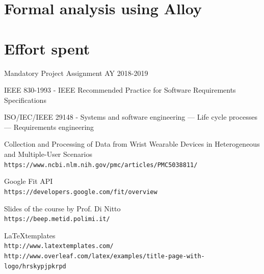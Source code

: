 \documentclass[12pt]{article}
\begin{document}
\clearpage
\section{Formal analysis using Alloy}
\label{sec:alloy}

\clearpage
\section{Effort spent}
\label{sec:effort}

\clearpage
\begin{thebibliography}{9}
   Mandatory Project Assignment AY 2018-2019

   IEEE 830-1993 - IEEE Recommended Practice for Software Requirements Specifications

   ISO/IEC/IEEE 29148 - Systems and software engineering — Life cycle processes — Requirements engineering

   Collection and Processing of Data from Wrist Wearable Devices in Heterogeneous and Multiple-User Scenarios \\
  \texttt{https://www.ncbi.nlm.nih.gov/pmc/articles/PMC5038811/}

   Google Fit API\\
  \texttt{https://developers.google.com/fit/overview}

  Slides of the course by Prof. Di Nitto
  \\\texttt{https://beep.metid.polimi.it/}

  \LaTeX templates
  \\\texttt{http://www.latextemplates.com/}
  \\\texttt
  {http://www.overleaf.com/latex/examples/title-page-with-logo/hrskypjpkrpd}


\end{thebibliography}
\end{document}

